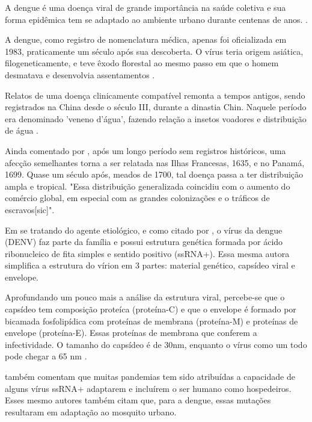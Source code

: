 \indent A dengue é uma doença viral de grande importância na saúde coletiva e sua forma epidêmica tem se adaptado ao ambiente urbano durante centenas de anos. \cite{ArboviralTransmission}.

\indent A dengue, como registro de nomenclatura médica, apenas foi oficializada em 1983, praticamente um século após sua descoberta. O vírus teria origem asiática, filogeneticamente, e teve êxodo florestal ao mesmo passo em que o homem desmatava e desenvolvia assentamentos \cite{Valle2015Dengue}.

\indent Relatos de uma doença clinicamente compatível remonta a tempos antigos, sendo registrados na China desde o século III, durante a dinastia Chin. Naquele período era denominado 'veneno d'água', fazendo relação a insetos voadores e distribuição de água \cite{Valle2015Dengue}.

\indent Ainda comentado por , após um longo período sem registros históricos, uma afecção semelhantes torna a ser relatada nas Ilhas Francesas, 1635, e no Panamá, 1699. Quase um século após, meados de 1700, tal doença passa a ter distribuição ampla e tropical. "Essa distribuição generalizada coincidiu com o aumento do comércio global, em especial com as grandes colonizações e o tráficos de escravos[sic]".

\indent Em se tratando do agente etiológico, e como citado por , o vírus da dengue (\acrfull{DENV}) faz parte da família  e possui estrutura genética formada por ácido ribonucleico de fita simples e sentido positivo (\acrfull{ssRNA+}). Essa mesma autora simplifica a estrutura do vírion em 3 partes: material genético, capsídeo viral e envelope.

\indent Aprofundando um pouco mais a análise da estrutura viral, percebe-se que o capsídeo tem composição proteíca (proteína-C) e que o envelope é formado por bicamada fosfolipídica com proteínas de membrana (proteína-M) e proteínas de envelope (proteína-E). Essas proteínas de membrana que conferem a infectividade. O tamanho do capsídeo é de 30nm, enquanto o vírus como um todo pode chegar a 65 nm \cite{Fiocruz2010Atlas}. 

 também comentam que muitas pandemias tem sido atribuídas a capacidade de alguns vírus \acrshort{ssRNA+} adaptarem e incluírem o ser humano como hospedeiros. Esses mesmo autores também citam que, para a dengue, essas mutações resultaram em adaptação ao mosquito urbano.

